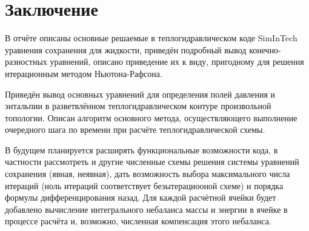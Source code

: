 
\section{Заключение}
\label{sec:conclusion}
В отчёте описаны основные решаемые в теплогидравлическом коде SimInTech уравнения сохранения для жидкости, приведён подробный вывод конечно-разностных уравнений, описано приведение их к виду, пригодному для решения итерационным методом Нью\-то\-на-Рафсона.

Приведён вывод основных уравнений для определения полей давления и энтальпии в разветвлённом теплогидравлическом контуре произвольной топологии. Описан алгоритм основного метода, осуществляющего выполнение очередного шага по времени при расчёте теплогидравлической схемы. 

В будущем планируется расширять функциональные возможности кода, в частности рассмотреть и другие численные схемы решения системы уравнений сохранения (явная, неявная), дать возможность выбора максимального числа итераций (ноль итераций соответствует безытерациооной схеме) и порядка формулы дифференцирования назад. Для каждой расчётной ячейки будет добавлено вычисление интегрального небаланса массы и энергии в ячейке в процессе расчёта и, возможно, численная компенсация этого небаланса. 

\newpage




